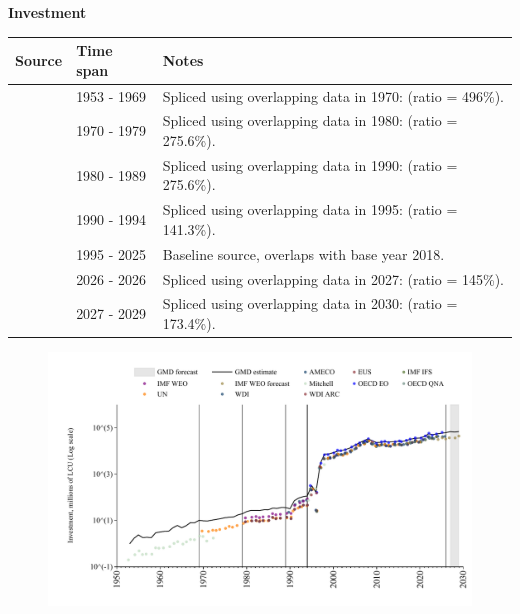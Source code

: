 \documentclass[12pt,a4paper,landscape]{article}
\begin{document}
\begin{adjustbox}{max totalsize={\paperwidth}{\paperheight},center}
\begin{minipage}[t][\textheight][t]{\textwidth}
\vspace*{0.5cm}
{}
\begin{center}
{\Large\bfseries Investment}
\end{center}
\vspace{0.5cm}
\begin{table}[H]
\centering
\small
\begin{tabular}{|l|l|l|}
\hline
\textbf{Source} & \textbf{Time span} & \textbf{Notes} \\
\hline
\rowcolor{white}\cite{Mitchell}& 1953 - 1969 &Spliced using overlapping data in 1970: (ratio = 496\%). \\
\rowcolor{lightgray}\cite{UN}& 1970 - 1979 &Spliced using overlapping data in 1980: (ratio = 275.6\%). \\
\rowcolor{white}\cite{WDI}& 1980 - 1989 &Spliced using overlapping data in 1990: (ratio = 275.6\%). \\
\rowcolor{lightgray}\cite{AMECO}& 1990 - 1994 &Spliced using overlapping data in 1995: (ratio = 141.3\%). \\
\rowcolor{white}\cite{OECD_EO}& 1995 - 2025 &Baseline source, overlaps with base year 2018. \\
\rowcolor{lightgray}\cite{AMECO}& 2026 - 2026 &Spliced using overlapping data in 2027: (ratio = 145\%). \\
\rowcolor{white}\cite{IMF_WEO_forecast}& 2027 - 2029 &Spliced using overlapping data in 2030: (ratio = 173.4\%). \\
\hline
\end{tabular}
\end{table}
\begin{figure}[H]
\centering
\includegraphics[width=\textwidth,height=0.6\textheight,keepaspectratio]{graphs/BGR_inv.pdf}
\end{figure}
\end{minipage}
\end{adjustbox}
\end{document}
